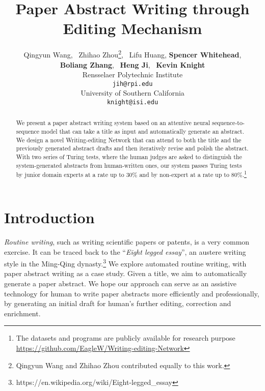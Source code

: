 \documentclass[11pt,a4paper]{article}
\title{Paper Abstract Writing through Editing Mechanism}
\author{
Qingyun Wang, \ Zhihao Zhou\thanks{Qingyun Wang and Zhihao Zhou contributed equally to this work.}, \ Lifu Huang,  \textbf{Spencer Whitehead}, \\ \textbf{Boliang Zhang}, \ \textbf{Heng Ji}, \ \textbf{Kevin Knight} \\
 Rensselaer Polytechnic Institute \\
{\tt jih@rpi.edu} \\
 University of Southern California \\
{\tt knight@isi.edu}
}
\date{}
\begin{document}
\maketitle

\begin{abstract}

We present a paper abstract writing system based on an attentive neural sequence-to-sequence model that can take a title as input and automatically generate an abstract. We design a novel Writing-editing Network that can attend to both the title and the previously generated abstract drafts and then iteratively revise and polish the abstract. With two series of Turing tests, where the human judges are asked to distinguish the system-generated abstracts from human-written ones,
our system passes Turing tests by junior domain experts at a rate up to 30\% and by non-expert at a rate up to 80\%.\footnote{The datasets and programs are publicly available for research purpose \url{https://github.com/EagleW/Writing-editing-Network}}


















\end{abstract} \section{Introduction}





\emph{Routine writing}, such as writing scientific papers or patents, is a very common exercise.
It can be traced back to the ``\textit{Eight legged essay}'', an austere writing style in the Ming-Qing dynasty.\footnote{https://en.wikipedia.org/wiki/Eight-legged\_essay} 
We explore automated routine writing, with
paper abstract writing as a case study. Given a title, we aim to automatically generate a paper abstract. 
We hope our approach can serve as an assistive technology for human to write paper abstracts more efficiently and professionally, by generating an initial draft for human’s further editing, correction and enrichment.
\end{document}
